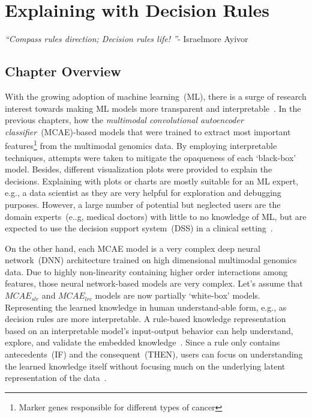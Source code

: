 \chapter{Explaining with Decision Rules}\label{chapter:xai_rules}
\textit{``Compass rules direction; Decision rules life! ''}- Israelmore Ayivor

\section{Chapter Overview} \label{chapter_7:cw}
With the growing adoption of machine learning~(ML), there is a surge of research interest towards making ML models more transparent and interpretable~\cite{ming2018rulematrix}. In the previous chapters, how the \textit{multimodal convolutional autoencoder classifier}~(MCAE)-based models that were trained to extract most important features\footnote{Marker genes responsible for different types of cancer} from the multimodal genomics data. By employing interpretable techniques, attempts were taken to mitigate the opaqueness of each `black-box' model.
Besides, different visualization plots were provided to explain the decisions. Explaining with plots or charts are mostly suitable for an ML expert, e.g., a data scientist as they are very helpful for exploration and debugging purposes. However, a large number of potential but neglected users are the domain experts~(e..g, medical doctors) with little to no knowledge of ML, but are expected to use the decision support system~(DSS) in a clinical setting~\cite{ming2018rulematrix}.


\hspace*{3.5mm} On the other hand, each MCAE model is a very complex deep neural network~(DNN) architecture trained on high dimensional multimodal genomics data. Due to highly non-linearity containing higher order interactions among features, those neural network-based models are very complex. Let's assume that $MCAE_{slr}$ and $MCAE_{lrc}$ models are now partially `white-box' models. Representing the learned knowledge in human understand-able form, e.g., as decision rules are more interpretable. A rule-based knowledge representation based on an interpretable model's input-output behavior can help understand, explore, and validate the embedded knowledge~\cite{ming2018rulematrix}. Since a rule only contains antecedents~(IF) and the consequent~(THEN), users can focus on understanding the learned knowledge itself without focusing much on the underlying latent representation of the data~\cite{ming2018rulematrix}. 


